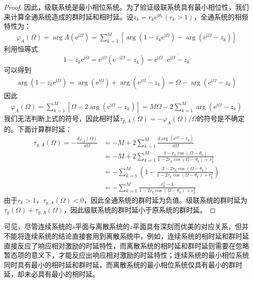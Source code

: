 \begin{proof}
    因此，级联系统是最小相位系统。为了验证级联系统具有最小相位性，我们来计算全通系统造成的群时延和相时延。设$z_k=r_k \mathrm{e}^{\mathrm{i}\theta_k}(r_k>1)$，全通系统的相频特性为：
    \begin{align*}
        \varphi_A(\Omega)=\arg A(\mathrm{e}^{\mathrm{i}\Omega})=\sum_{k=1}^{M}\left[\arg(1-\overline{z_k}\mathrm{e}^{\mathrm{i}\Omega})-\arg(\mathrm{e}^{\mathrm{i}\Omega}-z_k)\right]
    \end{align*}
    利用恒等式
    $$1-\overline{z_k} \mathrm{e}^{\mathrm{i}\Omega}=\mathrm{e}^{\mathrm{i}\Omega}(\mathrm{e}^{-\mathrm{i}\Omega}-\overline{z_k})=\mathrm{e}^{\mathrm{i}\Omega}\cdot\overline{\mathrm{e}^{\mathrm{i}\Omega}-z_k}$$
    可以得到
    \begin{align*}
        \arg(1-\overline{z_k}\mathrm{e}^{\mathrm{i}\Omega})=\arg(\mathrm{e}^{\mathrm{i}\Omega})+\arg(\overline{\mathrm{e}^{\mathrm{i}\Omega}-z_k})=\Omega-\arg(\mathrm{e}^{\mathrm{i}\Omega}-z_k)
    \end{align*}
    因此\begin{align*}
        \varphi_A(\Omega)=\sum_{k=1}^{M}\left[\Omega-2\arg(\mathrm{e}^{\mathrm{i}\Omega}-z_k)\right]=M\Omega-2\sum_{k=1}^{M}\arg(\mathrm{e}^{\mathrm{i}\Omega}-z_k)
    \end{align*}
    我们无法判断上式的符号，因此相时延$\tau_{p,A}(\Omega)=-\varphi_A(\Omega)/\Omega$的符号是不确定的。下面计算群时延：
    \begin{align*}
        \tau_{g,A}(\Omega)=-\frac{d\varphi_A(\Omega)}{d\Omega}&=-M+2\sum_{k=1}^{M}\frac{d\arg(\mathrm{e}^{\mathrm{i}\Omega}-z_k)}{d\Omega}\\
        &=-M+2\sum_{k=1}^{M}\frac{1-r_k\cos(\Omega-\theta_k)}{1-2r_k\cos(\Omega-\theta_k)+r_k^2}\\
        &=-\sum_{k=1}^{M}\left(1-\frac{2-2r_k\cos(\Omega-\theta_k)}{1-2r_k\cos(\Omega-\theta_k)+r_k^2}\right)\\
        &=-\sum_{k=1}^{M}\frac{r_k^2-1}{1-2r_k\cos(\Omega-\theta_k)+r_k^2}
    \end{align*}
    由于$r_k>1$，$\tau_{g,A}(\Omega)<0$，因此全通系统的群时延为负值。级联系统的群时延为$\tau_g(\Omega)+\tau_{g,A}(\Omega)$，因此级联系统的群时延小于原系统的群时延。
\end{proof}

可见，尽管连续系统的$s$平面与离散系统的$z$平面具有深刻而优美的对应关系，但并不能将连续系统的结论直接套用到离散系统中，例如，连续系统的相时延和群时延直接反应了响应相对激励的时延特性，而离散系统的相时延和群时延则需要在忽略暂态项的意义下，才能反应出响应相对激励的时延特性；连续系统的最小相位系统同时具有最小的相时延和群时延，而离散系统的最小相位系统仅具有最小的群时延，却未必具有最小的相时延。
